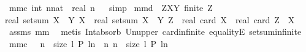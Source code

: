 \begin{isabellebody}
\ mm{}{}c{\isacharcolon}\ {\isachardoublequoteopen}int\ {\isacharparenleft}n{\isacharcolon}{\isacharcolon}nat{\isacharparenright}\ {\isacharequal}\ real\ n{\isachardoublequoteclose}%
\isadelimproof
\ %
\endisadelimproof
%
\isatagproof
{}\isamarkupfalse%
\ simp%
\endisatagproof
{\isafoldproof}%
%
\isadelimproof
%
\endisadelimproof
\isanewline
\isanewline
{}\isamarkupfalse%
\ mm{}{}d{\isacharcolon}\ \ {\isachardoublequoteopen}Z{\isasymsubseteq}X{\isasymunion}Y{\isachardoublequoteclose}\ {\isachardoublequoteopen}finite\ Z{\isachardoublequoteclose}\ \ \isanewline
{\isachardoublequoteopen}real\ {\isacharparenleft}setsum\ {\isacharparenleft}X\ {\isacharless}{\isacharbar}\ Y{\isacharparenright}\ X{\isacharparenright}\ {\isacharminus}\ real\ {\isacharparenleft}setsum\ {\isacharparenleft}X\ {\isacharless}{\isacharbar}\ Y{\isacharparenright}\ Z{\isacharparenright}\ {\isacharequal}\ real\ {\isacharparenleft}card\ X{\isacharparenright}\ {\isacharminus}\ real\ {\isacharparenleft}card\ {\isacharparenleft}Z\ {\isasyminter}\ X{\isacharparenright}{\isacharparenright}{\isachardoublequoteclose}\ \isanewline
%
\isadelimproof
%
\endisadelimproof
%
\isatagproof
{}\isamarkupfalse%
\ assms\ mm{}{}\ \isamarkupfalse%
\ {\isacharparenleft}metis\ Int{\isacharunderscore}absorb{}\ Un{\isacharunderscore}upper{}\ card{\isacharunderscore}infinite\ equalityE\ setsum{\isachardot}infinite{\isacharparenright}%
\endisatagproof
{\isafoldproof}%
%
\isadelimproof
\isanewline
%
\endisadelimproof
\isanewline
\isanewline
\isanewline
\isanewline
\isanewline
\isanewline
\isanewline
\isanewline
\isanewline
\isanewline
\isanewline
\isanewline
\isanewline
\isanewline
\isanewline
\isanewline
\isanewline
\isanewline
\isanewline
\isanewline
\isanewline
\isanewline
\isanewline
\isanewline
\isanewline
\isanewline
\isanewline
\isanewline
\isanewline
\isanewline
\isanewline
\isanewline
\isanewline
\isanewline
\isanewline
{}\isamarkupfalse%
\ mm{}{}c{\isacharcolon}\ \ {\isachardoublequoteopen}{\isasymexists}\ n\ {\isasymin}\ {\isacharbraceleft}{}{\isachardot}{\isachardot}{\isacharless}size\ l{\isacharbraceright}{\isachardot}\ P\ {\isacharparenleft}l{\isacharbang}n{\isacharparenright}{\isachardoublequoteclose}\ \ {\isachardoublequoteopen}{\isacharbrackleft}n{\isachardot}\ n\ {\isasymleftarrow}\ {\isacharbrackleft}{}{\isachardot}{\isachardot}{\isacharless}size\ l{\isacharbrackright}{\isacharcomma}\ P\ {\isacharparenleft}l{\isacharbang}n{\isacharparenright}{\isacharbrackright}\ {\isasymnoteq}\ {\isacharbrackleft}{\isacharbrackright}{\isachardoublequoteclose}\isanewline

\end{isabellebody}
